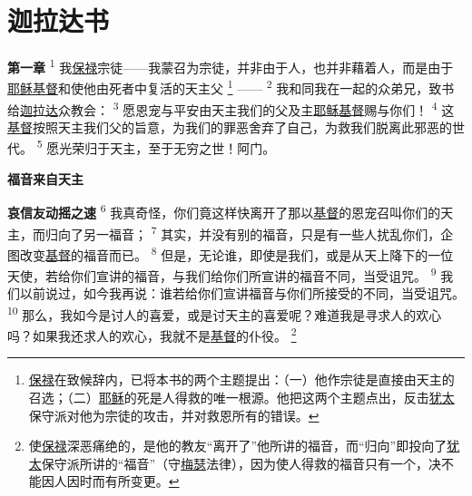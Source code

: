 \chapter*{迦拉达书}


\textbf{第一章\quad}
\textsuperscript{1}
我\uline{保禄}宗徒——我蒙召为宗徒，并非由于人，也并非藉着人，而是由于\uline{耶稣}\uline{基督}和使他由死者中复活的天主父
\footnote{\uline{保禄}在致候辞内，已将本书的两个主题提出：（一）他作宗徒是直接由天主的召选；（二）\uline{耶稣}的死是人得救的唯一根源。他把这两个主题点出，反击\uline{犹太}保守派对他为宗徒的攻击，并对救恩所有的错误。}
——
\textsuperscript{2}
我和同我在一起的众弟兄，致书给\uline{迦拉达}众教会：
\textsuperscript{3}
愿恩宠与平安由天主我们的父及主\uline{耶稣}\uline{基督}赐与你们！
\textsuperscript{4}
这\uline{基督}按照天主我们父的旨意，为我们的罪恶舍弃了自己，为救我们脱离此邪恶的世代。
\textsuperscript{5}
愿光荣归于天主，至于无穷之世！阿门。

\begin{center}
	\textbf{\large{\songti 福音来自天主}}
\end{center}

\textbf{哀信友动摇之速\quad}
\textsuperscript{6}
我真奇怪，你们竟这样快离开了那以\uline{基督}的恩宠召叫你们的天主，而归向了另一福音；
\textsuperscript{7}
其实，并没有别的福音，只是有一些人扰乱你们，企图改变\uline{基督}的福音而已。
\textsuperscript{8}
但是，无论谁，即使是我们，或是从天上降下的一位天使，若给你们宣讲的福音，与我们给你们所宣讲的福音不同，当受诅咒。
\textsuperscript{9}
我们以前说过，如今我再说：谁若给你们宣讲福音与你们所接受的不同，当受诅咒。
\textsuperscript{10}
那么，我如今是讨人的喜爱，或是讨天主的喜爱呢？难道我是寻求人的欢心吗？如果我还求人的欢心，我就不是\uline{基督}的仆役。
\footnote{使\uline{保禄}深恶痛绝的，是他的教友“离开了”他所讲的福音，而“归向”即投向了\uline{犹太}保守派所讲的“福音”（守\uline{梅瑟}法律），因为使人得救的福音只有一个，决不能因人因时而有所变更。}

